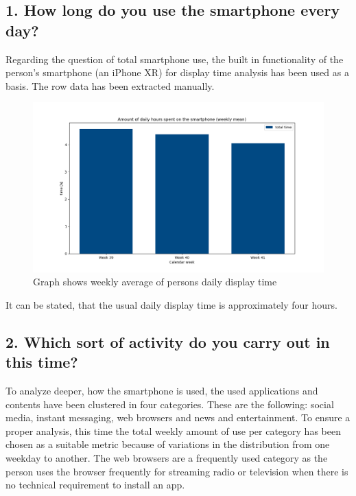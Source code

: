 \documentclass[11pt,a4paper]{article}
\begin{document}
\subsection*{1. How long do you use the smartphone every day?}
Regarding the question of total smartphone use, the built in functionality of the person's smartphone (an iPhone XR) for display time analysis has been used as a basis. The row data has been extracted manually. 

\begin{figure}[H]
\centering
\includegraphics[width = \textwidth]{../data/usage-times-total.png}
\caption{Graph shows weekly average of persons daily display time}
\end{figure}

It can be stated, that the usual daily display time is approximately four hours.

\subsection*{2. Which sort of activity do you carry out in this time?}
To analyze deeper, how the smartphone is used, the used applications and contents have been clustered in four categories. These are the following: social media, instant messaging, web browsers and news and entertainment. To ensure a proper analysis, this time the total weekly amount of use per category has been chosen as a suitable metric because of variations in the distribution from one weekday to another. The web browsers are a frequently used category as the person uses the browser frequently for streaming radio or television when there is no technical requirement to install an app.
\end{document}
